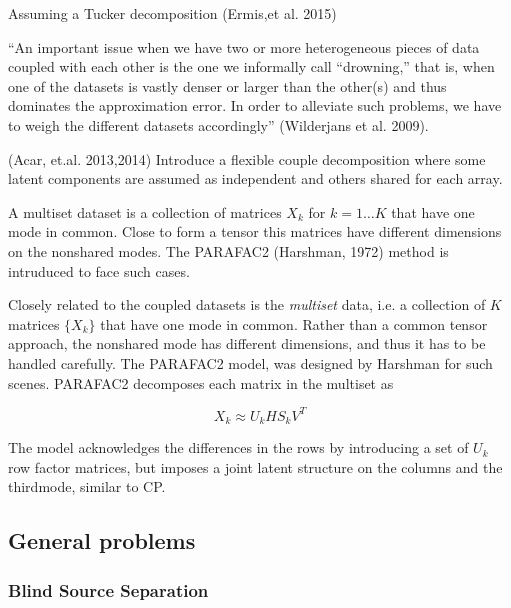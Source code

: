 \documentclass[letterpaper,12pt]{article}
\begin{document}
Assuming a Tucker decomposition (Ermis,et al. 2015)

“An important issue when we have two or more heterogeneous pieces of data coupled with each other is the one we informally call “drowning,” that is, when one of the datasets is vastly denser or larger than the other(s) and thus dominates the approximation error. In order to alleviate such problems, we have to weigh the different datasets accordingly” (Wilderjans et al. 2009).

(Acar, et.al. 2013,2014) Introduce a flexible couple decomposition where some latent components are assumed as independent and others shared for each array.

A multiset dataset is a collection of matrices ${X_k}$ for $k=1\ldots K$ that have one mode in common. Close to form a tensor this matrices have different dimensions on the nonshared modes. The PARAFAC2 (Harshman, 1972) method is intruduced to face such cases.



Closely related to the coupled datasets is the \textit{multiset} data, i.e. a collection of $K$ matrices $\{X_k\}$ that have one mode in common. Rather than a common tensor approach, the nonshared mode has different dimensions, and thus it has to be handled carefully. The PARAFAC2 model, was designed by Harshman \cite{Harshman1970} for such scenes. PARAFAC2 decomposes each matrix in the multiset as

$$X_k\approx U_kHS_kV^T$$

The model acknowledges the differences in the rows by introducing a set of $U_k$ row factor matrices, but imposes a joint latent structure on the columns and the thirdmode, similar to CP.

\subsection{General problems}


 \subsubsection{Blind Source Separation}
 
\end{document}
